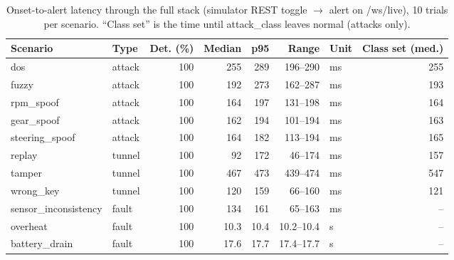 \begin{table}[t]
\centering
\caption{Onset-to-alert latency through the full stack (simulator REST toggle $\rightarrow$ alert on /ws/live), 10 trials per scenario. ``Class set'' is the time until attack\_class leaves normal (attacks only).}
\label{tab:sys_latency}
\scriptsize
\begin{tabular}{llrrrrlr}
\toprule
Scenario & Type & Det. (\%) & Median & p95 & Range & Unit & Class set (med.) \\
\midrule
dos & attack & 100 & 255 & 289 & 196--290 & ms & 255 \\
fuzzy & attack & 100 & 192 & 273 & 162--287 & ms & 193 \\
rpm\_spoof & attack & 100 & 164 & 197 & 131--198 & ms & 164 \\
gear\_spoof & attack & 100 & 162 & 194 & 101--194 & ms & 163 \\
steering\_spoof & attack & 100 & 164 & 182 & 113--194 & ms & 165 \\
replay & tunnel & 100 & 92 & 172 & 46--174 & ms & 157 \\
tamper & tunnel & 100 & 467 & 473 & 439--474 & ms & 547 \\
wrong\_key & tunnel & 100 & 120 & 159 & 66--160 & ms & 121 \\
sensor\_inconsistency & fault & 100 & 134 & 161 & 65--163 & ms & -- \\
overheat & fault & 100 & 10.3 & 10.4 & 10.2--10.4 & s & -- \\
battery\_drain & fault & 100 & 17.6 & 17.7 & 17.4--17.7 & s & -- \\
\bottomrule
\end{tabular}
\end{table}
